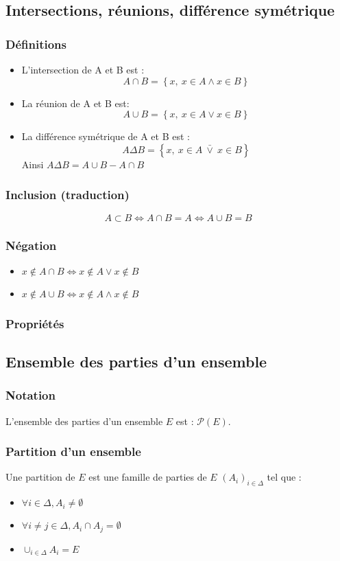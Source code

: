 \documentclass[12pt,a4paper,french]{book}
\begin{document}
		\subsection{Intersections, réunions, différence symétrique}
			\subsubsection{Définitions}
				\begin{itemize}
					\item L'intersection de A et B est : \[A \cap B = \left\{x, \ x \in A \wedge x \in B\right\}\]
					\item La réunion de A et B est: \[A \cup B = \left\{x,\ x \in A \vee x \in B\right\}\]
					\item  La différence symétrique de A et B est : \[A \Delta B =\left\{x,\ x \in A \ \bar{\vee} \ x \in B\right\} \]
					Ainsi $A \Delta B  = A \cup B - A\cap B$ 
				\end{itemize}
			\subsubsection{Inclusion (traduction)}
			\[A \subset B \Leftrightarrow A \cap B = A \Leftrightarrow A \cup B = B\]
			\subsubsection{Négation}
			\begin{itemize}
				\item $x \notin A \cap B \Leftrightarrow x \notin A \vee x \notin B$
				\item  $x \notin A \cup B \Leftrightarrow x\notin A \wedge x \notin B$
			\end{itemize}
			\subsubsection{Propriétés}

		\subsection{Ensemble des parties d'un ensemble}
			\subsubsection{Notation}
			L'ensemble des parties d'un ensemble $E$ est : $\mathcal{P}(E)$.
			\subsubsection{Partition d'un ensemble}
			Une partition de $E$ est une famille de parties de $E$ $(A_i)_{i\in \Delta}$ tel que : \begin{itemize}
				\item $\forall i \in \Delta, A_i \neq \emptyset$
				\item $\forall i \neq j \in \Delta, A_i \cap A_j = \emptyset$
				\item $\cup_{i \in \Delta} A_i  = E$
			\end{itemize}
\end{document}
